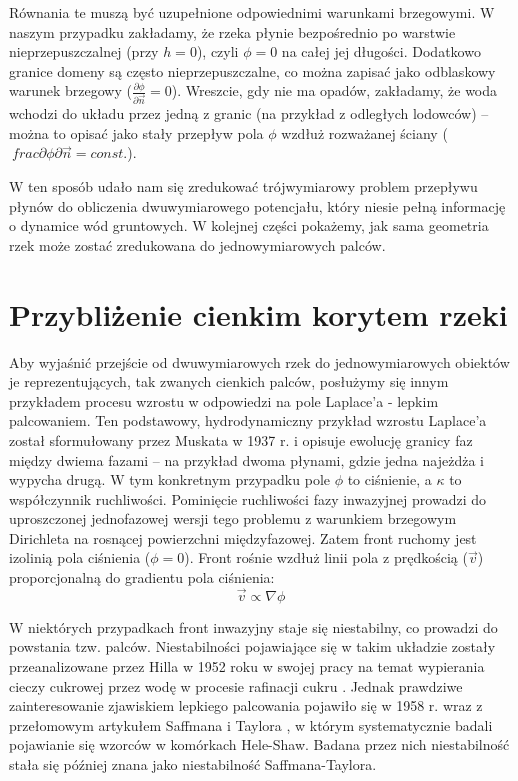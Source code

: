 \documentclass[]{pracamgr}
\begin{document}
      Równania te muszą być uzupełnione odpowiednimi warunkami brzegowymi. W naszym przypadku zakładamy, że rzeka płynie bezpośrednio po warstwie nieprzepuszczalnej (przy $h = 0$), czyli $ \phi = 0 $ na całej jej długości. Dodatkowo granice domeny są często nieprzepuszczalne, co można zapisać jako odblaskowy warunek brzegowy ($\frac{\partial \phi} {\partial \vec{n}} = 0$). Wreszcie, gdy nie ma opadów, zakładamy, że woda wchodzi do układu przez jedną z granic (na przykład z odległych lodowców) -- można to opisać jako stały przepływ pola $\phi$ wzdłuż rozważanej ściany ($\ frac{\partial \phi} {\partial \vec{n}} = const.$).
      
      W ten sposób udało nam się zredukować trójwymiarowy problem przepływu płynów do obliczenia dwuwymiarowego potencjału, który niesie pełną informację o dynamice wód gruntowych. W kolejnej części pokażemy, jak sama geometria rzek może zostać zredukowana do jednowymiarowych palców.

    \section{Przybliżenie cienkim korytem rzeki}

      Aby wyjaśnić przejście od dwuwymiarowych rzek do jednowymiarowych obiektów je reprezentujących, tak zwanych cienkich palców, posłużymy się innym przykładem procesu wzrostu w odpowiedzi na pole Laplace'a - lepkim palcowaniem. Ten podstawowy, hydrodynamiczny przykład wzrostu Laplace'a został sformułowany przez Muskata w 1937 r. \cite{muskat1937flow} i opisuje ewolucję granicy faz między dwiema fazami – na przykład dwoma płynami, gdzie jedna najeżdża i wypycha drugą. W tym konkretnym przypadku pole $\phi$ to ciśnienie, a $\kappa$ to współczynnik ruchliwości. Pominięcie ruchliwości fazy inwazyjnej prowadzi do uproszczonej jednofazowej wersji tego problemu z warunkiem brzegowym Dirichleta na rosnącej powierzchni międzyfazowej. Zatem front ruchomy jest izolinią pola ciśnienia ($\phi = 0$). Front rośnie wzdłuż linii pola z prędkością ($\vec{v}$) proporcjonalną do gradientu pola ciśnienia:
      \begin{equation}
        \vec{v} \propto \nabla \phi
      \end{equation}

      W niektórych przypadkach front inwazyjny staje się niestabilny, co prowadzi do powstania tzw. palców. Niestabilności pojawiające się w takim układzie zostały przeanalizowane przez Hilla w 1952 roku w swojej pracy na temat wypierania cieczy cukrowej przez wodę w procesie rafinacji cukru \cite{hill1952channeling}. Jednak prawdziwe zainteresowanie zjawiskiem lepkiego palcowania pojawiło się w 1958 r. wraz z przełomowym artykułem Saffmana i Taylora \cite{saffman1958penetration}, w którym systematycznie badali pojawianie się wzorców w komórkach Hele-Shaw. Badana przez nich niestabilność stała się później znana jako niestabilność Saffmana-Taylora.
\end{document}
